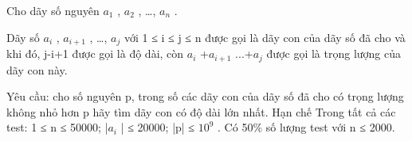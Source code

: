 Cho dãy số nguyên $a_{1}$   , $a_{2}$   , …, $a_{n}$   .  

   Dãy số $a_{i}$   , $a_{i+1}$   , …, $a_{j}$   với 1 ≤ i ≤ j ≤ n được gọi là dãy con của dãy số đã cho và khi đó, j-i+1 được gọi là độ dài, còn   $a_{i}$   +$a_{i+1}$   ...+$a_{j}$   được gọi là trọng lượng của dãy con này.  

   Yêu cầu: cho số nguyên p, trong số các dãy con của dãy số đã cho có trọng lượng không nhỏ hơn p hãy tìm dãy con có độ dài lớn nhất.
Hạn chế
Trong tất cả các test: 1 ≤ n ≤ 50000;  |$a_{i}$   | ≤ 20000; |p| ≤ $10^{9}$   . Có 50\% số lượng test với n ≤ 2000.